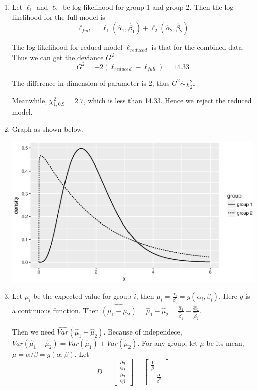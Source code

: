 \documentclass{article}
\begin{document}
\begin{enumerate}[leftmargin = 0 em, label = \arabic*., font = \bfseries]
	\item Let $\ell_1$ and $\ell_2$ be log likelihood for group 1 and group 2. Then the log likelihood for the full model is
	\[\ell_{full} = \ell_1 (\hat{\alpha}_1, \hat{\beta}_1) + \ell_2 (\hat{\alpha}_2, \hat{\beta}_2) \]

	The log likelihood for redued model $\ell_{reduced}$ is that for the combined data. Thus we can get the deviance $G^2$ 
	\[G^2 = -2(\ell_{reduced} - \ell_{full}) = 14.33\]

	The difference in dimension of parameter is 2, thus $G^2 \overset{.}{\sim} \chi^2_{2}$.

	Meanwhile, $\chi_{1, 0.9}^2 = 2.7$, which is less than 14.33. Hence we reject the reduced model.


	\item 
	Graph as shown below.
	\begin{center}
		\includegraphics[width = .8\textwidth]{Rplot.eps}
	\end{center}


	\item 
	Let $\mu_i$ be the expected value for group $i$, then $\mu_i = \frac{\alpha_i}{\beta_i} = g(\alpha_i, \beta_i)$. Here $g$ is a continuous function. Then $\widehat{(\mu_1 - \mu_2)} = \hat{\mu}_1 - \hat{\mu}_2 = \frac{\hat{\alpha}_1}{\hat{\beta}_1} - \frac{\hat{\alpha}_2}{\hat{\beta}_2} $.

    Then we need $\hat{Var}(\hat{\mu}_1 - \hat{\mu}_2)$. Because of independece, $Var(\hat{\mu}_1 - \hat{\mu}_2) = Var(\hat{\mu}_1) + Var(\hat{\mu}_2)$. For any group, let $\mu$ be its mean, $\mu = \alpha / \beta = g(\alpha, \beta)$. Let 
    \[D = \begin{bmatrix}
    	\frac{\partial g}{\partial \alpha}\\
    	\frac{\partial g}{\partial \beta}
    \end{bmatrix} = 
    \begin{bmatrix}
    	\frac{1}{\beta}\\
    	-\frac{\alpha}{\beta^2}
    \end{bmatrix}\]


\end{enumerate}
\end{document}
